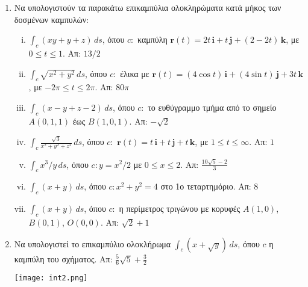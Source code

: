 



\pagestyle{askhseis}
\everymath{\displaystyle}



\begin{center}
\minibox{\large\bfseries \textcolor{Col1}{Επικαμπύλιο Ολοκλήρωμα Ιου είδους}}
\end{center}

\vspace{\baselineskip}


\begin{enumerate}
  \item Να υπολογιστούν τα παρακάτω επικαμπύλια ολοκληρώματα κατά μήκος των 
    δοσμένων καμπυλών:
    \begin{enumerate}[i)]
      \item $ \int _{c} (xy+y+z) \,{ds} $, όπου $ c \colon $ καμπύλη 
        $ \mathbf{r}(t)=2t\, \mathbf{i} + t\, \mathbf{j} + (2-2t) \, \mathbf{k} $, 
        με $ 0 \leq t \leq 1 $.  
        \hfill Απ: $13/2$ 
      \item $ \int _{c} \sqrt{x^{2}+y^{2}} \,{ds} $, όπου $ c \colon $ έλικα με 
        $ \mathbf{r}(t)=(4 \cos{t} )\, \mathbf{i} + (4 \sin{t})\, \mathbf{j} + 3t \, 
        \mathbf{k} $, με $ -2 \pi \leq t \leq 2 \pi $.  
        \hfill Απ: $80 \pi$ 
      \item $ \int _{c} (x-y+z-2) \,{ds} $, όπου $ c \colon $ το ευθύγραμμο τμήμα 
        από το σημείο $ A(0,1,1) $ έως $ B(1,0,1) $.
        \hfill Απ: $ -\sqrt{2} $ 
      \item $ \int _{c} \frac{\sqrt{3}}{x^{2}+y^{2}+z^{2}}\,{ds} $, όπου $ c \colon $ 
        $ \mathbf{r}(t)= t\, \mathbf{i} + t\, \mathbf{j} + t\, 
        \mathbf{k} $, με $1 \leq t \leq \infty$.  
        \hfill Απ: $1$ 
      \item $ \int _{c} x^{3}/y \,{ds} $, όπου $ c \colon y=x^{2}/2 $ με 
        $0 \leq x \leq 2$.  
        \hfill Απ: $ \frac{10 \sqrt{5} -2}{3} $ 
      \item $ \int _{c} (x+y) \,{ds} $, όπου $ c \colon x^{2}+y^{2}=4 $ στο 1ο
        τεταρτημόριο.  \hfill Απ: $8$ 
      \item $ \int _{c} (x+y) \,{ds} $, όπου $ c \colon $ η περίμετρος τριγώνου 
        με κορυφές $ A(1,0) $, $ B(0,1) $, $ O(0,0) $.
        \hfill Απ: $ \sqrt{2} +1 $ 

    \end{enumerate}

  \item Να υπολογιστεί το επικαμπύλιο ολοκλήρωμα $ \int _{c} (x+ \sqrt{y}) \,{ds} $, 
    όπου $ c $ η καμπύλη του σχήματος.
        \hfill Απ: $ \frac{5}{6} \sqrt{5} + \frac{3}{2} $ 

        \texttt{[image: int2.png]}
\end{enumerate}

